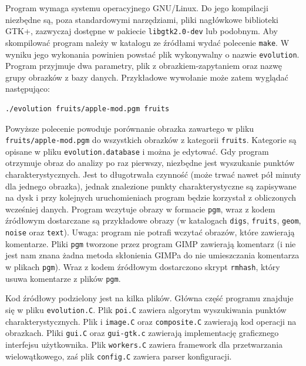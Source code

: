 \documentclass[a4paper,12pt,leqno]{article}
\begin{document}
Program wymaga systemu operacyjnego GNU/Linux. Do jego kompilacji niezbędne są, poza standardowymi narzędziami, pliki nagłówkowe biblioteki GTK+,
zazwyczaj dostępne w pakiecie \texttt{libgtk2.0-dev} lub podobnym. Aby skompilować program należy w katalogu ze źródłami wydać polecenie \texttt{make}.
W wyniku jego wykonania powinien powstać plik wykonywalny o nazwie \texttt{evolution}. Program przyjmuje dwa parametry, plik z obrazkiem-zapytaniem oraz
nazwę grupy obrazków z bazy danych. Przykładowe wywołanie może zatem wyglądać następująco:
\begin{verbatim}./evolution fruits/apple-mod.pgm fruits\end{verbatim}
Powyższe polecenie powoduje porównanie obrazka zawartego w pliku \texttt{fruits/apple-mod.pgm} do wszystkich obrazków z kategorii \texttt{fruits}.
Kategorie są opisane w pliku \texttt{evolution.database} i można je edytować. Gdy program otrzymuje obraz do analizy po raz pierwszy, niezbędne jest
wyszukanie punktów charakterystycznych. Jest to długotrwała czynność (może trwać nawet pół minuty dla jednego obrazka), jednak znalezione punkty
charakterystyczne są zapisywane na dysk i przy kolejnych uruchomieniach program będzie korzystał z obliczonych wcześniej danych. Program wczytuje
obrazy w formacie \texttt{pgm}, wraz z kodem źródłowym dostarczane są przykładowe obrazy (w katalogach \texttt{digs}, \texttt{fruits}, \texttt{geom},
\texttt{noise} oraz \texttt{text}). Uwaga: program nie potrafi wczytać obrazów, które zawierają komentarze. Pliki \texttt{pgm} tworzone przez program
GIMP zawierają komentarz (i nie jest nam znana żadna metoda skłonienia GIMPa do nie umieszczania komentarza w plikach \texttt{pgm}). Wraz z kodem
źródłowym dostarczono skrypt \texttt{rmhash}, który usuwa komentarze z plików \texttt{pgm}.

Kod źródłowy podzielony jest na kilka plików. Główna część programu znajduje się w pliku \texttt{evolution.C}. Plik \texttt{poi.C} zawiera algorytm
wyszukiwania punktów charakterystycznych. Plik i \texttt{image.C} oraz \texttt{composite.C} zawierają kod operacji na obrazkach. Pliki \texttt{gui.C}
oraz \texttt{gui-gtk.c} zawierają implementację graficznego interfejsu użytkownika. Plik \texttt{workers.C} zawiera framework dla przetwarzania
wielowątkowego, zaś plik \texttt{config.C} zawiera parser konfiguracji.
\end{document}
